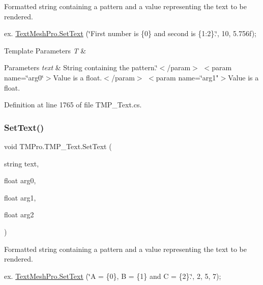 Formatted string containing a pattern and a value representing the text to be rendered.

ex. \mbox{\hyperlink{class_t_m_pro_1_1_t_m_p___text_a8aebc83540d494fd574a92470762fdaa}{Text\+Mesh\+Pro.\+Set\+Text}} (\char`\"{}\+First number is \{0\} and second is \{1\+:2\}.\char`\"{}, 10, 5.\+756f);


\begin{DoxyTemplParams}{Template Parameters}
{\em T} & \\
\hline
\end{DoxyTemplParams}

\begin{DoxyParams}{Parameters}
{\em text} & String containing the pattern.\char`\"{}$<$/param$>$
$<$param name=\char`\"{}arg0\char`\"{}$>$\+Value is a float.$<$/param$>$
$<$param name=\char`\"{}arg1"$>$Value is a float.\\
\hline
\end{DoxyParams}


Definition at line 1765 of file T\+M\+P\+\_\+\+Text.\+cs.

\mbox{\label{class_t_m_pro_1_1_t_m_p___text_a5b24897f4f2252899c7f09238facc745}} 
\subsubsection{\texorpdfstring{SetText()}{SetText()}\hspace{0.1cm}{\footnotesize\ttfamily [5/6]}}
{\footnotesize\ttfamily void T\+M\+Pro.\+T\+M\+P\+\_\+\+Text.\+Set\+Text (\begin{DoxyParamCaption}\item[{string}]{text,  }\item[{float}]{arg0,  }\item[{float}]{arg1,  }\item[{float}]{arg2 }\end{DoxyParamCaption})}





Formatted string containing a pattern and a value representing the text to be rendered.

ex. \mbox{\hyperlink{class_t_m_pro_1_1_t_m_p___text_a8aebc83540d494fd574a92470762fdaa}{Text\+Mesh\+Pro.\+Set\+Text}} (\char`\"{}\+A = \{0\}, B = \{1\} and C = \{2\}.\char`\"{}, 2, 5, 7);


